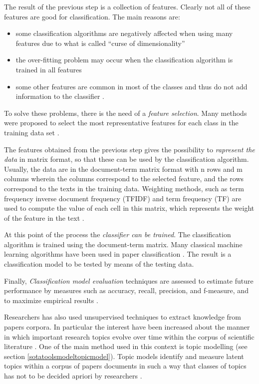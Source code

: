 \documentclass[]{book}
\theoremstyle{definition}
\theoremstyle{definition}
\theoremstyle{definition}
\theoremstyle{remark}
\begin{document}
The result of the previous step is a collection of features. Clearly not
all of these features are good for classification. The main reasons are:

\begin{itemize}
\item
  some classification algorithms are negatively affected when using many
  features due to what is called ``curse of dimensionality''
\item
  the over-fitting problem may occur when the classification algorithm
  is trained in all features
\item
  some other features are common in most of the classes and thus do not
  add information to the classifier .
\end{itemize}

To solve these problems, there is the need of a \emph{feature
selection}. Many methods were proposed to select the most representative
features for each class in the training data set
\citep{zhao2012r, weiss2010text, weiss2015fundamentals}.

The features obtained from the previous step gives the possibility to
\emph{rapresent the data} in matrix format, so that these can be used by
the classification algorithm. Usually, the data are in the document-term
matrix format with n rows and m columns wherein the columns correspond
to the selected feature, and the rows correspond to the texts in the
training data. Weighting methods, such as term frequency inverse
document frequency (TFIDF) and term frequency (TF) are used to compute
the value of each cell in this matrix, which represents the weight of
the feature in the text \citep{meyer2008text}.

At this point of the process the \emph{classifier can be trained}. The
classification algorithm is trained using the document-term matrix. Many
classical machine learning algorithms have been used in paper
classification
\citep{hotho2005brief, aphinyanaphongs2003text, zhao2012r}. The result
is a classification model to be tested by means of the testing data.

Finally, \emph{Classification model evaluation} techniques are assessed
to estimate future performance by measures such as accuracy, recall,
precision, and f-measure, and to maximize empirical results
\citep{weiss2015fundamentals}.

Researchers has also used unsupervised techniques to extract knowledge
from papers corpora. In particular the interest have been increased
about the manner in which important research topics evolve over time
within the corpus of scientific literature \citep{zhou2017topic}. One of
the main method used in this context is topic modelling (see section
\ref{sotatoolsmodeltopicmodel}). Topic models identify and measure
latent topics within a corpus of papers documents
\citep{seaghdha2014unsupervised} in such a way that classes of topics
has not to be decided apriori by researchers
\citep{gargiulo2017deep, yang2016discriminative, paraschiv2015semantic}.
\end{document}
